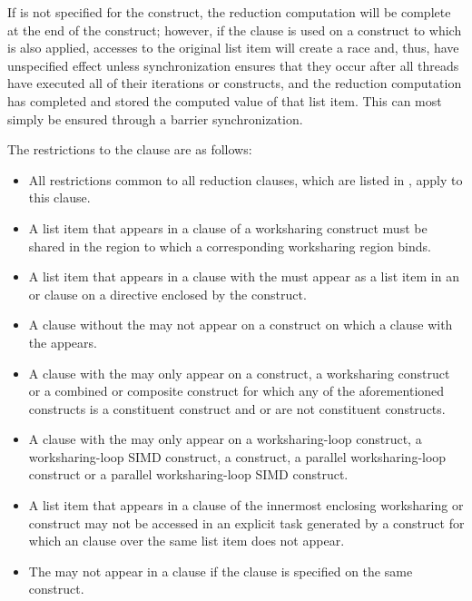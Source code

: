 If  is not specified for the construct, the reduction computation 
will be complete at the end of the construct; however, if the  
clause is used on a construct to which  is also applied, accesses 
to the original list item will create a race and, thus, have unspecified effect 
unless synchronization ensures that they occur after all threads have executed 
all of their iterations or  constructs, and the reduction computation
has completed and stored the computed value of that list item. This can most 
simply be ensured through a barrier synchronization.

\restrictions
The restrictions to the  clause are as follows:

\begin{itemize}
\item All restrictions common to all reduction clauses, which are listed in
      , apply to
      this clause.
\item A list item that appears in a  clause of a worksharing
      construct must be shared in the  region to which a corresponding
      worksharing region binds.
\item A list item that appears in a  clause with the  
       must appear as a list item in an  or
       clause on a  directive enclosed by the construct.
\item A  clause without the   
      may not appear on a construct on which a  clause with the
        appears.
\item A  clause with the  
      may only appear on a  construct, a worksharing construct
      or a combined or composite construct for which any of the aforementioned 
      constructs is a constituent construct and  or  are 
      not constituent constructs.
\item A  clause with the  
      may only appear on a worksharing-loop construct, a worksharing-loop SIMD
      construct, a  construct, a parallel worksharing-loop construct or
      a parallel worksharing-loop SIMD construct.
\item A list item that appears in a  clause of the innermost
      enclosing worksharing or  construct may not be accessed in an
      explicit task generated by a construct for which an  clause
      over the same list item does not appear.
\item The   may not appear in a  
      clause if the  clause is specified on the same construct.


\end{itemize}
